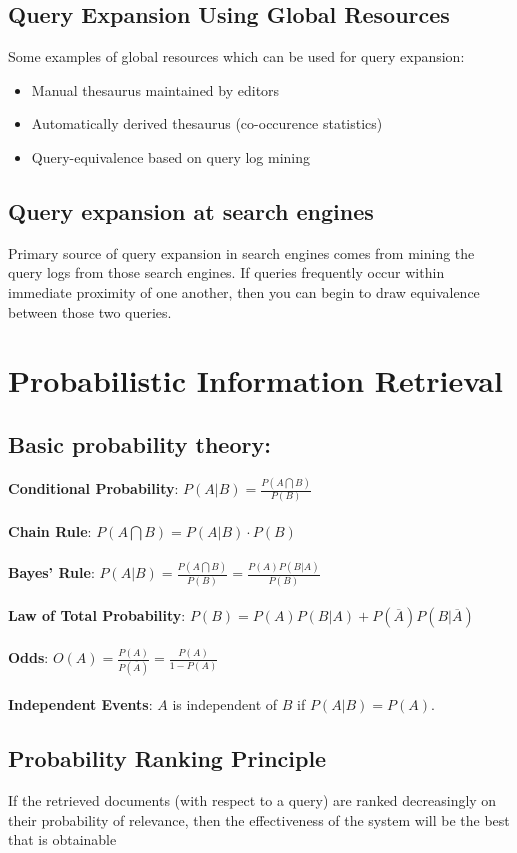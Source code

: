 \documentclass{article}%
\begin{document}
\subsection*{Query Expansion Using Global Resources}
Some examples of global resources which can be used for query expansion:
\begin{itemize}
    \item Manual thesaurus maintained by editors
    \item Automatically derived thesaurus (co-occurence statistics)
    \item Query-equivalence based on query log mining
\end{itemize}
\subsection*{Query expansion at search engines}
Primary source of query expansion in search engines comes from mining the query logs from those search engines. If queries frequently occur
within immediate proximity of one another, then you can begin to draw equivalence between those two queries.
\section*{Probabilistic Information Retrieval}
\subsection*{Basic probability theory:}
\textbf{Conditional Probability}: $P(A | B) = \frac{P(A \bigcap B)}{P(B)}$ \\
\\
\textbf{Chain Rule}: $P(A \bigcap B) = P(A | B) \cdot P(B)$ \\
\\
\textbf{Bayes' Rule}: $P(A | B) = \frac{P(A \bigcap B)}{P(B)} = \frac{P(A)P(B | A)}{P(B)}$ \\
\\
\textbf{Law of Total Probability}: $P(B) = P(A) P(B | A) + P(\overline{A}) P(B | \overline{A})$ \\
\\
\textbf{Odds}: $O(A) = \frac{P(A)}{P(\overline{A})} = \frac{P(A)}{1 - P(A)}$ \\
\\
\textbf{Independent Events}: $A$ is independent of $B$ if $P(A | B) = P(A)$.
\subsection*{Probability Ranking Principle}
If the retrieved documents (with respect to a query) are ranked decreasingly on their probability of
relevance, then the effectiveness of the system will be the best that is obtainable
\end{document}
